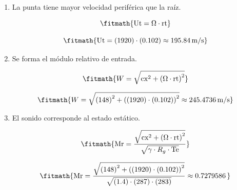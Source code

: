 \begin{enumerate}

\item La punta tiene mayor velocidad periférica que la raíz.

\[\fitmath{\mathrm{Ut}=\Omega\cdot \mathrm{rt}}\]

\[\fitmath{\mathrm{Ut}=(1920)\cdot (0.102)\approx 195.84\,\mathrm{m/s}}\]

\item Se forma el módulo relativo de entrada.

\[\fitmath{W=\sqrt{{\mathrm{cx}}^{2}+{\left(\Omega\cdot \mathrm{rt}\right)}^{2}}}\]

\[\fitmath{W=\sqrt{{(148)}^{2}+{\left((1920)\cdot (0.102)\right)}^{2}}\approx 245.4736\,\mathrm{m/s}}\]

\item El sonido corresponde al estado estático.

\[\fitmath{\mathrm{Mr}=\frac{\sqrt{{\mathrm{cx}}^{2}+{\left(\Omega\cdot \mathrm{rt}\right)}^{2}}}{\sqrt{\gamma\cdot R_g\cdot \mathrm{Te}}}}\]

\[\fitmath{\mathrm{Mr}=\frac{\sqrt{{(148)}^{2}+{\left((1920)\cdot (0.102)\right)}^{2}}}{\sqrt{(1.4)\cdot (287)\cdot (283)}}\approx 0.7279586\,}\]

\end{enumerate}
